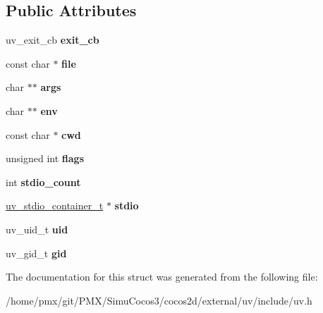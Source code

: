 \subsection*{Public Attributes}
\begin{DoxyCompactItemize}
\item 
\mbox{\label{structuv__process__options__s_a790244eaf851fc045cdce60b387e3018}} 
uv\+\_\+exit\+\_\+cb {\bfseries exit\+\_\+cb}
\item 
\mbox{\label{structuv__process__options__s_a18fadb35eb6a68235aa6ef538bf6b9ec}} 
const char $\ast$ {\bfseries file}
\item 
\mbox{\label{structuv__process__options__s_a7297aebe0907893435b51ccbec2f0211}} 
char $\ast$$\ast$ {\bfseries args}
\item 
\mbox{\label{structuv__process__options__s_a464c06d2224bb5f7346f705caa2f1778}} 
char $\ast$$\ast$ {\bfseries env}
\item 
\mbox{\label{structuv__process__options__s_af1a245d1e57a3e842c6809d151c20cd0}} 
const char $\ast$ {\bfseries cwd}
\item 
\mbox{\label{structuv__process__options__s_a6b919a5c9444670402a39cc290c31efb}} 
unsigned int {\bfseries flags}
\item 
\mbox{\label{structuv__process__options__s_a73d89821eff52c6730e7aa34c19f0a97}} 
int {\bfseries stdio\+\_\+count}
\item 
\mbox{\label{structuv__process__options__s_a48fa7367530baa12365d55632c1c1a39}} 
\hyperlink{structuv__stdio__container__s}{uv\+\_\+stdio\+\_\+container\+\_\+t} $\ast$ {\bfseries stdio}
\item 
\mbox{\label{structuv__process__options__s_a0eeca01e0f55b8fb6c3fd22ee8152869}} 
uv\+\_\+uid\+\_\+t {\bfseries uid}
\item 
\mbox{\label{structuv__process__options__s_acad7e416adee199b9529c8b34ca5f250}} 
uv\+\_\+gid\+\_\+t {\bfseries gid}
\end{DoxyCompactItemize}


The documentation for this struct was generated from the following file\+:\begin{DoxyCompactItemize}
\item 
/home/pmx/git/\+P\+M\+X/\+Simu\+Cocos3/cocos2d/external/uv/include/uv.\+h\end{DoxyCompactItemize}
